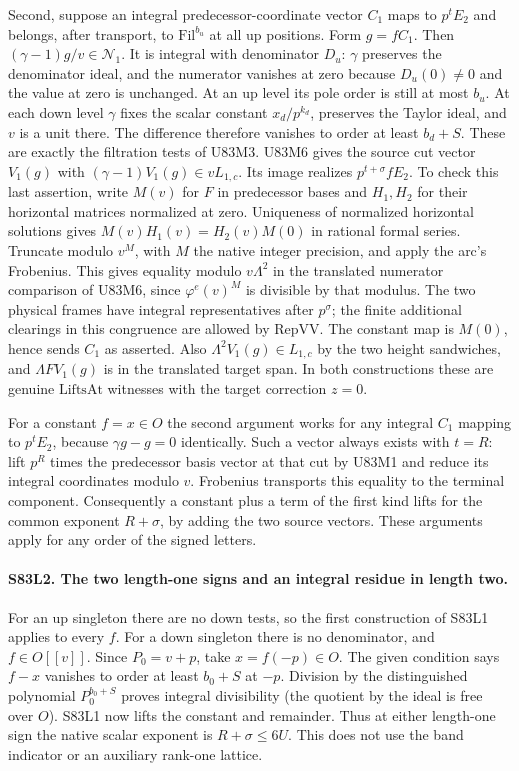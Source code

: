 Second, suppose an integral predecessor-coordinate vector $C_1$
maps to $p^t E_2$ and belongs, after transport, to
$\mathrm{Fil}^{b_u}$ at all up positions. Form $g=f C_1$.
Then $(\gamma-1)g/v\in\mathcal N_1$. It is integral with
denominator $D_u$: $\gamma$ preserves the denominator ideal, and
the numerator vanishes at zero because $D_u(0)\ne0$ and the value
at zero is unchanged. At an up level its pole order is still at
most $b_u$. At each down level $\gamma$ fixes the scalar constant
$x_d/p^{k_d}$, preserves the Taylor ideal, and $v$ is a unit there.
The difference therefore vanishes to order at least $b_d+S$.
These are exactly the filtration tests of U83M3.
U83M6 gives the source cut vector $V_1(g)$ with
$(\gamma-1)V_1(g)\in vL_{1,c}$.
Its image realizes $p^{t+\sigma}f E_2$. To check this last
assertion, write $M(v)$ for $F$ in predecessor bases and
$H_1,H_2$ for their horizontal matrices normalized at zero.
Uniqueness of normalized horizontal solutions gives
$M(v)H_1(v)=H_2(v)M(0)$ in rational formal series.
Truncate modulo $v^M$, with $M$ the native integer precision,
and apply the arc's Frobenius. This gives equality modulo $v\Lambda^2$
in the translated numerator comparison of U83M6, since
$\varphi^e(v)^M$ is divisible by that modulus. The two physical
frames have integral representatives after $p^\sigma$; the finite
additional clearings in this congruence are allowed by
$\mathrm{RepVV}$. The constant map is $M(0)$, hence sends $C_1$
as asserted. Also $\Lambda^2 V_1(g)\in L_{1,c}$ by the two
height sandwiches, and $\Lambda F V_1(g)$ is in the translated
target span. In both constructions these are genuine
$\mathrm{LiftsAt}$ witnesses with the target correction $z=0$.

For a constant $f=x\in O$ the second argument works for any
integral $C_1$ mapping to $p^t E_2$, because $\gamma g-g=0$
identically. Such a vector always exists with $t=R$: lift $p^R$
times the predecessor basis vector at that cut by U83M1 and
reduce its integral coordinates modulo $v$. Frobenius transports
this equality to the terminal component. Consequently a constant
plus a term of the first kind lifts for the common exponent
$R+\sigma$, by adding the two source vectors. These arguments
apply for any order of the signed letters.

\paragraph{S83L2. The two length-one signs and an integral residue in length two.}
For an up singleton there are no down tests, so the first
construction of S83L1 applies to every $f$. For a down singleton
there is no denominator, and $f\in O[[v]]$. Since $P_0=v+p$,
take $x=f(-p)\in O$. The given condition says $f-x$ vanishes
to order at least $b_0+S$ at $-p$. Division by the distinguished
polynomial $P_0^{b_0+S}$ proves integral divisibility
(the quotient by the ideal is free over $O$). S83L1 now lifts
the constant and remainder. Thus at either length-one sign the
native scalar exponent is $R+\sigma\le6U$. This does not use
the band indicator or an auxiliary rank-one lattice.

